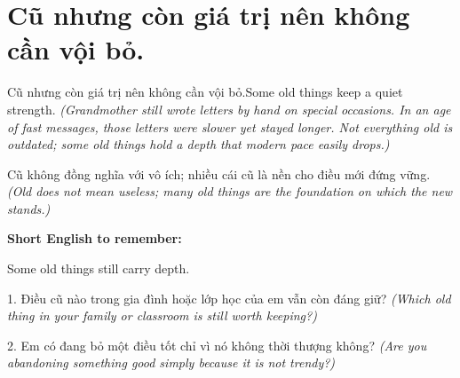\section{Cũ nhưng còn giá trị nên không cần vội bỏ.}
\begin{truyen}{Cũ nhưng còn giá trị nên không cần vội bỏ.}{Some old things keep a quiet strength.}
\textit{(Grandmother still wrote letters by hand on special occasions. In an age of fast messages, those letters were slower yet stayed longer. Not everything old is outdated; some old things hold a depth that modern pace easily drops.)}
\end{truyen}
\begin{baihoc}
Cũ không đồng nghĩa với vô ích; nhiều cái cũ là nền cho điều mới đứng vững.
\textit{(Old does not mean useless; many old things are the foundation on which the new stands.)}
\end{baihoc}
\begin{ghinhoanh}
\textbf{Short English to remember:}

Some old things still carry depth.
\end{ghinhoanh}
\begin{tuhocnhanh}
1. Điều cũ nào trong gia đình hoặc lớp học của em vẫn còn đáng giữ? \textit{(Which old thing in your family or classroom is still worth keeping?)}

2. Em có đang bỏ một điều tốt chỉ vì nó không thời thượng không? \textit{(Are you abandoning something good simply because it is not trendy?)}
\end{tuhocnhanh}
\ngancach

